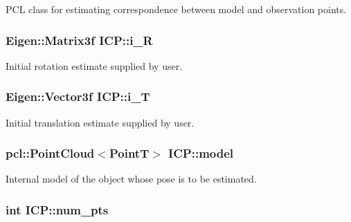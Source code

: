 \-P\-C\-L class for estimating correspondence between model and observation points. 

\hypertarget{classICP_a07164ef6066cf0c9537881871cd56601}{
\subsubsection[{i\-\_\-\-R}]{\setlength{\rightskip}{0pt plus 5cm}\-Eigen\-::\-Matrix3f {\bf \-I\-C\-P\-::i\-\_\-\-R}}}\label{classICP_a07164ef6066cf0c9537881871cd56601}


\-Initial rotation estimate supplied by user. 

\hypertarget{classICP_a63b486fc85453b0f09c6020e1c6227f4}{
\subsubsection[{i\-\_\-\-T}]{\setlength{\rightskip}{0pt plus 5cm}\-Eigen\-::\-Vector3f {\bf \-I\-C\-P\-::i\-\_\-\-T}}}\label{classICP_a63b486fc85453b0f09c6020e1c6227f4}


\-Initial translation estimate supplied by user. 

\hypertarget{classICP_ae224713dd84e34bbef52a011046527af}{
\subsubsection[{model}]{\setlength{\rightskip}{0pt plus 5cm}pcl\-::\-Point\-Cloud$<${\bf \-Point\-T}$>$ {\bf \-I\-C\-P\-::model}}}\label{classICP_ae224713dd84e34bbef52a011046527af}


\-Internal model of the object whose pose is to be estimated. 

\hypertarget{classICP_a9b8cf5129a0cb5ad3fd05b261d514bb6}{
\subsubsection[{num\-\_\-pts}]{\setlength{\rightskip}{0pt plus 5cm}int {\bf \-I\-C\-P\-::num\-\_\-pts}}}\label{classICP_a9b8cf5129a0cb5ad3fd05b261d514bb6}


